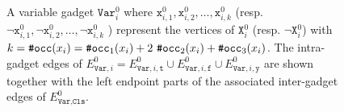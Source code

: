 \begin{figure}

  \caption{\label{fig-3-linear-graph-splitting-variable-gadget-0}%
  A variable gadget $\texttt{Var}^{0}_{i}$ where
  $\texttt{x}^{0}_{i,1}, \texttt{x}^{0}_{i,2}, \dots, \texttt{x}^{0}_{i,k}$
  (resp.
  $\neg\texttt{x}^{0}_{i,1}, \neg\texttt{x}^{0}_{i,2}, \dots, \neg\texttt{x}^{0}_{i,k}$
  )
  represent the vertices of $\texttt{X}^{0}_{i}$ (resp. $\neg\texttt{X}^{0}_{i}$) with
  $k = \operatorname{\texttt{\#occ}}(x_i) = \operatorname{\texttt{\#occ}}_1(x_i) + 2\,\operatorname{\texttt{\#occ}}_2(x_i) + \operatorname{\texttt{\#occ}}_3(x_i)$.
  The intra-gadget edges of $E^{0}_{\texttt{Var}, i} =
  E^{0}_{\texttt{Var}, i, \texttt{t}} \cup
  E^{0}_{\texttt{Var}, i, \texttt{f}} \cup
  E^{0}_{\texttt{Var}, i, \texttt{y}}$ are shown together
  with the left endpoint parts of the associated inter-gadget edges of
  $E^{0}_{\texttt{Var},\texttt{Cls}}$.
  }%
\end{figure}
